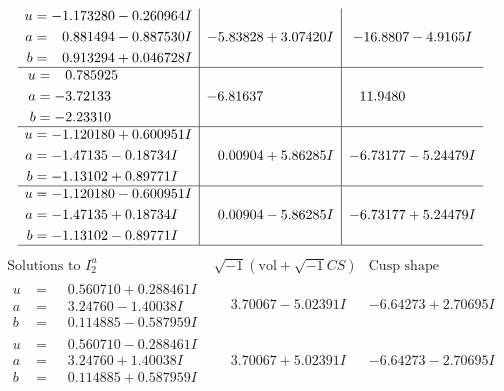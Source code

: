 \documentclass[1p]{elsarticle_modified}
\theoremstyle{definition}
\newcommand{\I}{\sqrt{-1}}
\begin{document}
$$\begin{array}{c|c|c}
\begin{aligned}
u &= -1.173280 - 0.260964 I \\
a &= \phantom{-}0.881494 - 0.887530 I \\
b &= \phantom{-}0.913294 + 0.046728 I\end{aligned}
 & -5.83828 + 3.07420 I & -16.8807 - 4.9165 I \\ \hline\begin{aligned}
u &= \phantom{-}0.785925\phantom{ +0.000000I} \\
a &= -3.72133\phantom{ +0.000000I} \\
b &= -2.23310\phantom{ +0.000000I}\end{aligned}
 & -6.81637\phantom{ +0.000000I} & \phantom{-}11.9480\phantom{ +0.000000I} \\ \hline\begin{aligned}
u &= -1.120180 + 0.600951 I \\
a &= -1.47135 - 0.18734 I \\
b &= -1.13102 + 0.89771 I\end{aligned}
 & \phantom{-}0.00904 + 5.86285 I & -6.73177 - 5.24479 I \\ \hline\begin{aligned}
u &= -1.120180 - 0.600951 I \\
a &= -1.47135 + 0.18734 I \\
b &= -1.13102 - 0.89771 I\end{aligned}
 & \phantom{-}0.00904 - 5.86285 I & -6.73177 + 5.24479 I\\
 \hline 
 \end{array}$$\newpage$$\begin{array}{c|c|c}  
\text{Solutions to }I^u_{2}& \I (\text{vol} + \sqrt{-1}CS) & \text{Cusp shape}\\
 \hline 
\begin{aligned}
u &= \phantom{-}0.560710 + 0.288461 I \\
a &= \phantom{-}3.24760 - 1.40038 I \\
b &= \phantom{-}0.114885 - 0.587959 I\end{aligned}
 & \phantom{-}3.70067 - 5.02391 I & -6.64273 + 2.70695 I \\ \hline\begin{aligned}
u &= \phantom{-}0.560710 - 0.288461 I \\
a &= \phantom{-}3.24760 + 1.40038 I \\
b &= \phantom{-}0.114885 + 0.587959 I\end{aligned}
 & \phantom{-}3.70067 + 5.02391 I & -6.64273 - 2.70695 I \\ \hline\begin{aligned}

\end{aligned}
\end{array}$$
\end{document}
